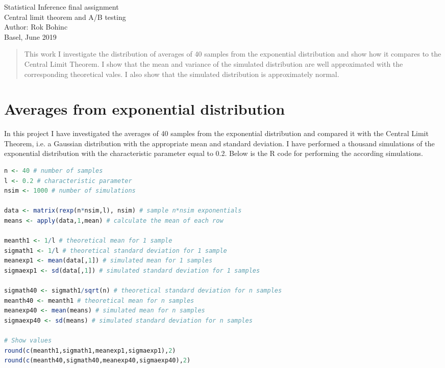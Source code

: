 \documentclass[a4paper,12pt]{article}
\begin{document}
\begin{titlepage}
\begin{center}
\large Statistical Inference final assignment\\[1cm]
\LARGE Central limit theorem and  A/B testing\\[1cm]
\large Author: Rok Bohinc \\
\large Basel, June 2019 \\[1 cm]
\end{center}

\begin{abstract}
This work I investigate the distribution of averages of 40 samples from the exponential distribution and show how it compares to the Central Limit Theorem. I show that the mean and variance of the simulated distribution are well approximated with the corresponding theoretical vales. I also show that the simulated distribution is approximately normal.

\end{abstract}
\end{titlepage}


\section{Averages from exponential distribution}

In this project I have investigated the averages of 40 samples from the exponential distribution and compared it with the Central Limit Theorem, i.e. a Gaussian distribution with the appropriate mean and standard deviation. I have performed a thousand simulations of the exponential distribution with the characteristic parameter equal to 0.2. Below is the R code for performing the according simulations.

\footnotesize
\begin{lstlisting}[backgroundcolor = \color{lightgray}, language=R]
n <- 40 # number of samples
l <- 0.2 # characteristic parameter
nsim <- 1000 # number of simulations

data <- matrix(rexp(n*nsim,l), nsim) # sample n*nsim exponentials
means <- apply(data,1,mean) # calculate the mean of each row

meanth1 <- 1/l # theoretical mean for 1 sample
sigmath1 <- 1/l # theoretical standard deviation for 1 sample
meanexp1 <- mean(data[,1]) # simulated mean for 1 samples
sigmaexp1 <- sd(data[,1]) # simulated standard deviation for 1 samples

sigmath40 <- sigmath1/sqrt(n) # theoretical standard deviation for n samples
meanth40 <- meanth1 # theoretical mean for n samples
meanexp40 <- mean(means) # simulated mean for n samples
sigmaexp40 <- sd(means) # simulated standard deviation for n samples

# Show values
round(c(meanth1,sigmath1,meanexp1,sigmaexp1),2)
round(c(meanth40,sigmath40,meanexp40,sigmaexp40),2)

\end{lstlisting}
\normalsize
\end{document}
